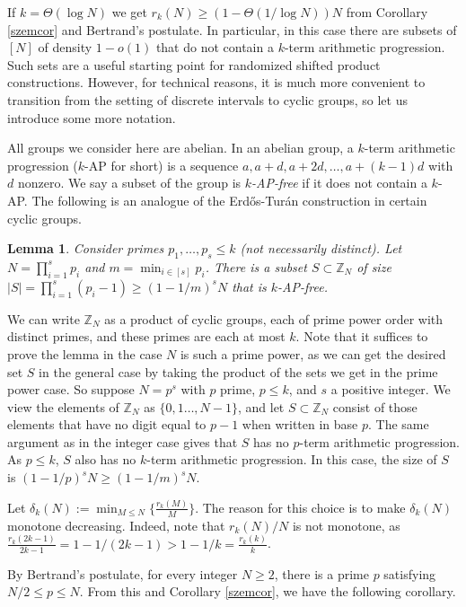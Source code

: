 \documentclass[11pt]{article}
\makeatletter
\numberwithin{equation}{section}
\renewenvironment{proof}[1][\proofname]{\par
  \vspace{-\topsep}%
  \pushQED{\qed}%
  \normalfont
  \topsep0pt \partopsep0pt %
  \trivlist
  \item[\hskip\labelsep
        \itshape
    #1\@addpunct{.}]\ignorespaces
}{%
  \popQED\endtrivlist\@endpefalse
  \addvspace{6pt plus 6pt} %
}
\newtheorem{lem}[result]{Lemma}
\theoremstyle{definition}
\theoremstyle{remark}
\makeatother
\begin{document}
If $k=\Theta(\log N)$ we get $r_k(N)\ge (1-\Theta(1/\log N))N$ from Corollary \ref{szemcor} and Bertrand's postulate. In particular, in this case there are subsets of $[N]$ of density $1-o(1)$ that do not contain a $k$-term arithmetic progression. Such sets are a useful starting point for randomized shifted product constructions. However, for technical reasons, it is much more convenient to transition from the setting of discrete intervals to cyclic groups, so let us introduce some more notation. 

All groups we consider here are abelian. In an abelian group, a $k$-term arithmetic progression ($k$-AP for short) is a sequence $a,a+d,a+2d,\ldots,a+(k-1)d$ with $d$ nonzero. We say a subset of the group is \textit{$k$-AP-free} if it does not contain a $k$-AP. The following is an analogue of the Erd\H{o}s-Tur\'an construction in certain cyclic groups.

\begin{lem}
Consider primes $p_1,\ldots,p_s \leq k$ (not necessarily distinct). Let $N=\prod_{i=1}^s p_i$ and $m= \min_{i \in [s]} p_i$. There is a subset $S \subset \mathbb{Z}_N$ of size $|S|=\prod_{i=1}^s (p_i-1) \geq (1-1/m)^s N$ that is $k$-AP-free. 
\end{lem}
\begin{proof}
We can write $\mathbb{Z}_N$ as a product of cyclic groups, each of prime power order with distinct primes, and these primes are each at most $k$. Note that it suffices to prove the lemma in the case $N$ is such a prime power, as we can get the desired set $S$ in the general case by taking the product of the sets we get in the prime power case. So suppose $N=p^s$ with $p$ prime, $p \leq k$, and $s$ a positive integer. We view the elements of $\mathbb{Z}_N$ as $\{0,1\ldots,N-1\}$, and let $S \subset \mathbb{Z}_N$ consist of those elements that have no digit equal to $p-1$ when written in base $p$. The same argument as in the integer case gives that $S$ has no $p$-term arithmetic progression. As $p \leq k$, $S$ also has no $k$-term arithmetic progression. In this case, the size of $S$ is $(1-1/p)^s N \ge (1-1/m)^s N$. 
\end{proof}


Let $\delta_k(N):= \min_{M\le N}\{\frac{r_k(M)}{M}\}$. The reason for this choice is to make $\delta_k(N)$ monotone decreasing. Indeed, note that $r_k(N)/N$ is not monotone, as $\frac{r_k(2k-1)}{2k-1}= 1-1/(2k-1)>1-1/k=\frac{r_k(k)}{k}$. 

By Bertrand's postulate, for every integer $N \geq 2$, there is a prime $p$ satisfying $N/2 \leq p \leq N$. From this and  Corollary \ref{szemcor}, we have the following corollary. 
\end{document}

